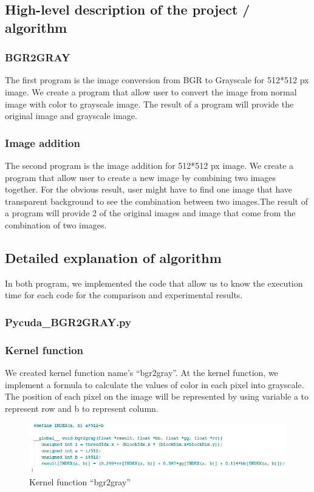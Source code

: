 \documentclass[11pt]{article}
\begin{document}
\subsection{High-level description of the project / algorithm}
\subsubsection*{BGR2GRAY}
The first program is the image conversion from BGR to Grayscale for 512*512 px image. We create a program that allow user to convert the image from normal image with color to grayscale image. The result of a program will provide the original image and grayscale image.
\subsubsection*{Image addition}
The second program is the image addition for 512*512 px image. We create a program that allow user to create a new image by combining two images together. For the obvious result, user might have to find one image that have transparent background to see the combination between two images.The result of a program will provide 2 of the original images and image that come from the combination of two images.


\newpage
\subsection{Detailed explanation of algorithm}
In both program, we implemented the code that allow us to know the execution time for each code for the comparison and experimental results\cite{KarolisR}. 
\subsubsection{Pycuda\_BGR2GRAY.py}
\subsubsection*{Kernel function}
We created kernel function name’s “bgr2gray”. At the kernel function, we implement a formula to calculate the values of color in each pixel into grayscale. The position of each pixel on the image will be represented by using variable a to represent row and b to represent column\cite{waspinator}\cite{wiki}.

\begin{figure}[h]
\centering
\includegraphics[scale=0.7]{bgr1}
\caption{Kernel function “bgr2gray”}
\end{figure}
\end{document}
